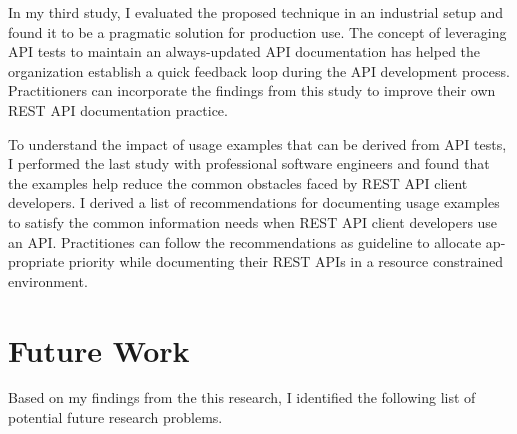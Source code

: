 \documentclass[12pt]{ucalgthes1}
\begin{document}
In my third study, I evaluated the proposed technique in an industrial setup and found it to be a pragmatic solution for production use. The concept of leveraging API tests to maintain an always-updated API documentation has helped the organization establish a quick feedback loop during the API development process. Practitioners can incorporate the findings from this study to improve their own REST API documentation practice.

To understand the impact of usage examples that can be derived from API tests, I performed the last study with professional software engineers and found that the examples help reduce the common obstacles faced by REST API client developers. I derived a list of recommendations for documenting usage examples to satisfy the common information needs when REST API client developers use an API. Practitiones can follow the recommendations as guideline to allocate ap- propriate priority while documenting their REST APIs in a resource constrained environment.

\section{Future Work}
Based on my findings from the this research, I identified the following list of potential future research problems.
\end{document}
